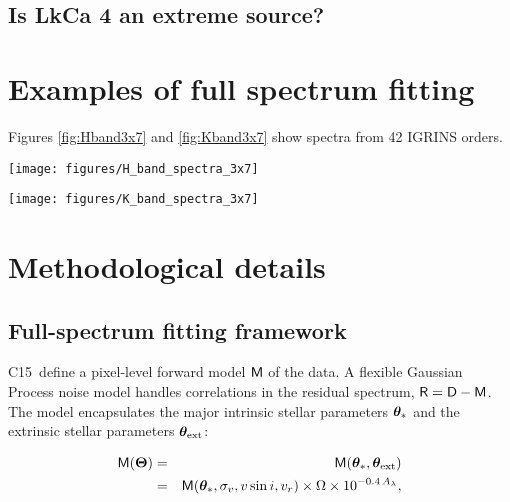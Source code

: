 \documentclass[twocolumn]{emulateapj}%
\newcommand{\iancze}{{\sc C15}}
\newcommand{\name}{LkCa 4 }
\begin{document}
\subsection{Is \name an extreme source?}



\clearpage
\pagebreak


\appendix

\section{Examples of full spectrum fitting}

Figures \ref{fig:Hband3x7} and \ref{fig:Kband3x7} show spectra from 42 IGRINS orders.


\begin{figure*}
	\centering
	\texttt{[image: figures/H\_band\_spectra\_3x7]}
	\caption{IGRINS Orders 94 and $99-119$.  Note that the $y-$axis is on a logarithmic scale.  }
	\label{fig:Hband3x7}
\end{figure*}

\begin{figure*}
	\centering
	\texttt{[image: figures/K\_band\_spectra\_3x7]}
	\caption{IGRINS Orders $73-93$.  Note that the $y-$axis is on a logarithmic scale.  }
	\label{fig:Kband3x7}
\end{figure*}


\section{Methodological details}
\label{methods-details}

\subsection{Full-spectrum fitting framework}

\iancze\ define a pixel-level forward model $\mathsf{M}$ of the data.  A flexible Gaussian Process noise model handles correlations in the residual spectrum, $\mathsf{R}= \mathsf{D} - \mathsf{M}$.  The model encapsulates the major intrinsic stellar parameters ${\bm \theta}_{\ast}$ and the extrinsic stellar parameters ${\bm \theta}_{\rm ext}$:

\begin{eqnarray} \label{eqn:scaling}
\mathsf{M}({\bm \Theta}) &=& \mathsf{M}({\bm \theta}_{\ast}, {\bm \theta}_{\rm ext}) \\
         &=& \mathsf{M}({\bm \theta}_{\ast}, \sigma_v, v\sin{i}, v_r) \times \Omega \times 10^{-0.4\,A_{\lambda}}, \nonumber
\end{eqnarray}
\end{document}
